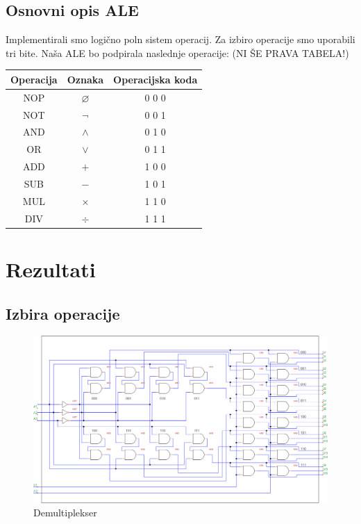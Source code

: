 \documentclass[seminar, slovene]{FRIreport}
\begin{document}
\subsection{Osnovni opis ALE}
Implementirali smo logično poln sistem operacij. Za izbiro operacije smo uporabili tri bite. Naša ALE bo podpirala naslednje operacije: (NI ŠE PRAVA TABELA!)

\begin{center}
\begin{tabular}{ | c | c | c | }\hline
\textbf{Operacija} & \textbf{Oznaka} & \textbf{Operacijska koda} \\ \hline
NOP & $\varnothing$ & 0 0 0 \\
NOT & $\lnot$ & 0 0 1 \\
AND & $\wedge$ & 0 1 0 \\
OR & $\vee$ & 0 1 1 \\
ADD & $+$ & 1 0 0 \\
SUB & $-$ & 1 0 1 \\
MUL & $\times$ & 1 1 0 \\
DIV & $\div$ & 1 1 1 \\ \hline
\end{tabular}
\end{center}

%
\section{Rezultati}
\subsection{Izbira operacije}
\begin{figure}[htb]
\includegraphics[width=15cm]{vezja/img/demux.png}
\caption{Demultiplekser}
\label{demux}
\end{figure}
\pagebreak
\end{document}
